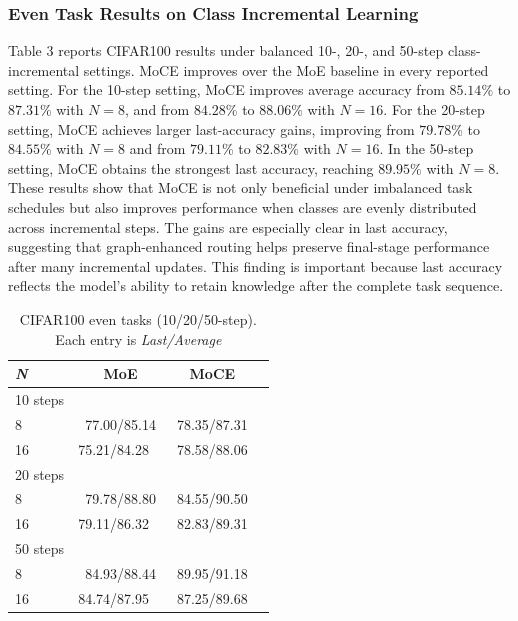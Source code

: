 \documentclass{article}
\theoremstyle{definition}
\theoremstyle{remark}
\begin{document}
\subsubsection{Even Task Results on Class Incremental Learning}
Table 3 reports CIFAR100 results under balanced 10-, 20-, and 50-step class-incremental settings. MoCE improves over the MoE baseline in every reported setting. For the 10-step setting, MoCE improves average accuracy from $85.14\%$ to $87.31\%$ with $N=8$, and from $84.28\%$ to $88.06\%$ with $N=16$. For the 20-step setting, MoCE achieves larger last-accuracy gains, improving from $79.78\%$ to $84.55\%$ with $N=8$ and from $79.11\%$ to $82.83\%$ with $N=16$. In the 50-step setting, MoCE obtains the strongest last accuracy, reaching $89.95\%$ with $N=8$.\\
These results show that MoCE is not only beneficial under imbalanced task schedules but also improves performance when classes are evenly distributed across incremental steps. The gains are especially clear in last accuracy, suggesting that graph-enhanced routing helps preserve final-stage performance after many incremental updates. This finding is important because last accuracy reflects the model's ability to retain knowledge after the complete task sequence.
\begin{table}[H]
\centering
\scriptsize
\setlength{\tabcolsep}{10pt}

\label{tab:cifar100_even_n8and16_ieee}
\begin{tabular}{lccc}
\toprule
\textit{\textbf{N}} & MoE & MoCE \\
\midrule
10 steps & & \\
\midrule
8& 77.00/85.14 & 78.35/87.31 \\
16& 75.21/84.28  & 78.58/88.06 \\

\midrule
20 steps & & \\
\midrule

8 & 79.78/88.80 & 84.55/90.50 \\


16& 79.11/86.32  & 82.83/89.31 \\

\midrule
50 steps & &\\
\midrule

8 & 84.93/88.44 & 89.95/91.18 \\


16& 84.74/87.95  & 87.25/89.68 \\

 \bottomrule
\end{tabular}
\vspace{1mm}

\caption{CIFAR100 even tasks (10/20/50-step). Each entry is \textit{Last/Average}
}
\footnotesize

\end{table}
\end{document}
